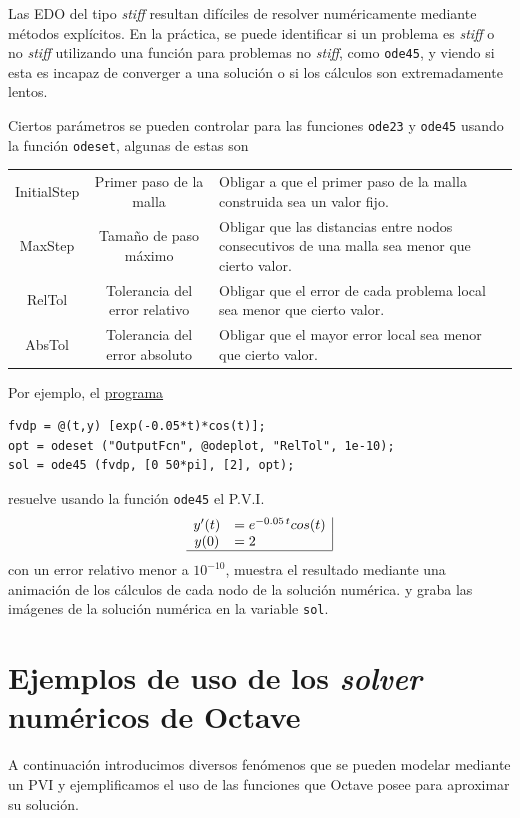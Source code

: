 \documentclass[letter,11pt]{article}
\newcommand{\octave}{{\sc Octave} }
\begin{document}
Las EDO  del tipo \emph{stiff} resultan dif\'iciles de resolver num\'ericamente mediante m\'etodos expl\'icitos. En la pr\'actica, se puede identificar si un problema es \emph{stiff} o no \emph{stiff} utilizando una funci\'on para problemas no \emph{stiff}, como \texttt{ode45}, y viendo si esta es incapaz de converger a una soluci\'on o si los c\'alculos son extremadamente lentos.

Ciertos par\'ametros se pueden controlar para las funciones \texttt{ode23} y \texttt{ode45} usando la funci\'on \texttt{odeset}, algunas de estas son

\begin{center}
    \begin{tabular}{|c||c|p{}}
    InitialStep
         &  Primer paso de la malla & Obligar a que el primer paso de la malla construida sea un valor fijo.\\
    MaxStep
        & Tama\~{n}o de paso m\'aximo   & Obligar que las distancias entre nodos consecutivos de una malla sea menor que cierto valor.\\
    RelTol
        & Tolerancia del error relativo & Obligar que el error de cada problema local sea menor que cierto valor.\\
    AbsTol
         & Tolerancia del error absoluto    & Obligar que el mayor error local sea menor que cierto valor.  \\
    \end{tabular}
\end{center}

Por ejemplo, el \href{ftp://ftp.ing-mat.udec.cl/pub/ing-mat/asignaturas/521230/ejercicios/2018-2/P3.m}{programa}

\begin{lstlisting}
fvdp = @(t,y) [exp(-0.05*t)*cos(t)];
opt = odeset ("OutputFcn", @odeplot, "RelTol", 1e-10);
sol = ode45 (fvdp, [0 50*pi], [2], opt);
\end{lstlisting}
resuelve usando la funci\'on \texttt{ode45} el P.V.I.
$$
\begin{array}{cl|}
y'(t) &=e^{-0.05\,t} cos(t) \\
y(0)    &=2\\ \hline
\end{array}
$$
con un error relativo menor a $10^{-10}$, muestra el resultado mediante una animaci\'on de los c\'alculos de cada nodo de la soluci\'on num\'erica. y graba las im\'agenes de la soluci\'on num\'erica en la variable \texttt{sol}.

\section{Ejemplos de uso de los \emph{solver} num\'ericos de \octave}
A continuaci\'on introducimos diversos fen\'omenos que se pueden modelar mediante un PVI y ejemplificamos el uso de las funciones que \octave posee para aproximar su soluci\'on.
\end{document}
